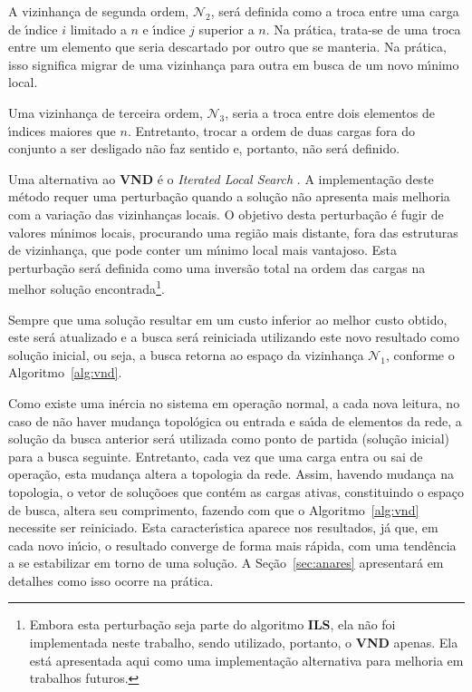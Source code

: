 A vizinhan{\c c}a de segunda ordem, $\mathcal{N}_{2}$, ser{\'a} definida como a troca entre uma carga de {\'\i}ndice $i$ limitado a $n$ e {\'\i}ndice $j$ superior a $n$. Na pr{\'a}tica, trata-se de uma troca entre um elemento que seria descartado por outro que se manteria. Na pr{\'a}tica, isso significa migrar de uma vizinhan{\c c}a para outra em busca de um novo m{\'\i}nimo local.

Uma vizinhan{\c c}a de terceira ordem, $\mathcal{N}_{3}$, seria a troca entre dois elementos de {\'\i}ndices maiores que $n$. Entretanto, trocar a ordem de duas cargas fora do conjunto a ser desligado n{\~a}o faz sentido e, portanto, n{\~a}o ser{\'a} definido.

Uma alternativa ao \textbf{VND} {\'e} o \textit{Iterated Local Search} \cite{lourencco2019}. A implementa{\c c}{\~a}o deste m{\'e}todo requer uma perturba{\c c}{\~a}o quando a solu{\c c}{\~a}o n{\~a}o apresenta mais melhoria com a varia{\c c}{\~a}o das vizinhan{\c c}as locais. O objetivo desta perturba{\c c}{\~a}o {\'e} fugir de valores m{\'\i}nimos locais, procurando uma regi{\~a}o mais distante, fora das estruturas de vizinhan{\c c}a, que pode conter um m{\'\i}nimo local mais vantajoso. Esta perturba{\c c}{\~a}o ser{\'a} definida como uma invers{\~a}o total na ordem das cargas na melhor solu{\c c}{\~a}o encontrada\footnote{Embora esta perturba{\c c}{\~a}o seja parte do algoritmo \textbf{ILS}, ela n{\~a}o foi implementada neste trabalho, sendo utilizado, portanto, o \textbf{VND} apenas. Ela est{\'a} apresentada aqui como uma implementa{\c c}{\~a}o alternativa para melhoria em trabalhos futuros.}.

Sempre que uma solu{\c c}{\~a}o resultar em um custo inferior ao melhor custo obtido, este ser{\'a} atualizado e a busca ser{\'a} reiniciada utilizando este novo resultado como solu{\c c}{\~a}o inicial, ou seja, a busca retorna ao espa{\c c}o da vizinhan{\c c}a $\mathcal{N}_{1}$, conforme o Algoritmo~\ref{alg:vnd}.

Como existe uma in{\'e}rcia no sistema em opera{\c c}{\~a}o normal, a cada nova leitura, no caso de n{\~a}o haver mudan{\c c}a topol{\'o}gica ou entrada e sa{\'\i}da de elementos da rede, a solu{\c c}{\~a}o da busca anterior ser{\'a} utilizada como ponto de partida (solu{\c c}{\~a}o inicial) para a busca seguinte. Entretanto, cada vez que uma carga entra ou sai de opera{\c c}{\~a}o, esta mudan{\c c}a altera a topologia da rede. Assim, havendo mudan{\c c}a na topologia, o vetor de solu{\c c}{\~o}oes que cont{\'e}m as cargas ativas, constituindo o espa{\c c}o de busca, altera seu comprimento, fazendo com que o Algoritmo~\ref{alg:vnd} necessite ser reiniciado. Esta caracter{\'\i}stica aparece nos resultados, j{\'a} que, em cada novo in{\'\i}cio, o resultado converge de forma mais r{\'a}pida, com uma tend{\^e}ncia a se estabilizar em torno de uma solu{\c c}{\~a}o. A Se{\c c}{\~a}o~\ref{sec:anares} apresentar{\'a} em detalhes como isso ocorre na pr{\'a}tica.

